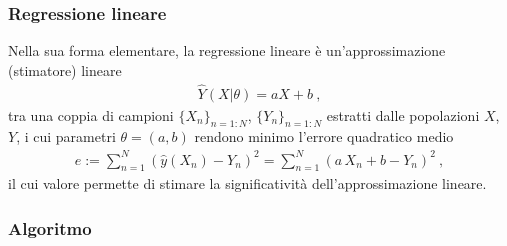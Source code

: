 \documentclass[letterpaper,10pt,italian]{jupyterBook}
\begin{document}
\subsubsection{Regressione lineare}
\label{\detokenize{ch/statistics/linear_regression:regressione-lineare}}\label{\detokenize{ch/statistics/linear_regression:statistics-hs-linear-regression}}\label{\detokenize{ch/statistics/linear_regression::doc}}
\sphinxAtStartPar
Nella sua forma elementare, la regressione lineare è un’approssimazione (stimatore) lineare
\begin{equation*}
\begin{split}\hat{Y}(X|\theta) = a X + b \ ,\end{split}
\end{equation*}
\sphinxAtStartPar
tra una coppia di campioni \(\{ X_n \}_{n=1:N}\), \(\{ Y_n \}_{n=1:N}\) estratti dalle popolazioni \(X\), \(Y\), i cui parametri \(\theta = (a,b)\) rendono minimo l’errore quadratico medio
\begin{equation*}
\begin{split}e:= \sum_{n=1}^{N} ( \hat{y}(X_n) - Y_n )^2 = \sum_{n=1}^N ( a \, X_n + b - Y_n )^2 \ ,\end{split}
\end{equation*}
\sphinxAtStartPar
il cui valore permette di stimare la significatività dell’approssimazione lineare.
\subsubsection*{Algoritmo}
\end{document}
